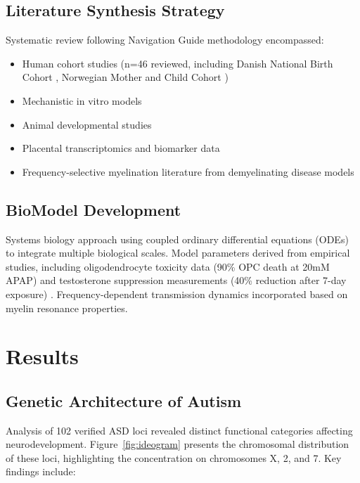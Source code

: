 \documentclass[12pt]{article}
\begin{document}
\subsection{Literature Synthesis Strategy}
Systematic review following Navigation Guide methodology \citep{navarro2025} encompassed:
\begin{itemize}
\item Human cohort studies (n=46 reviewed, including Danish National Birth Cohort \citep{liew2016}, Norwegian Mother and Child Cohort \citep{brandlistuen2013,ystrom2017})
\item Mechanistic in vitro models \citep{perez2012,posadas2019}
\item Animal developmental studies \citep{viberg2014,philippot2022,blecharz2018}
\item Placental transcriptomics and biomarker data \citep{ji2020}
\item Frequency-selective myelination literature from demyelinating disease models
\end{itemize}

\subsection{BioModel Development}
Systems biology approach using coupled ordinary differential equations (ODEs) to integrate multiple biological scales. Model parameters derived from empirical studies, including oligodendrocyte toxicity data (90\% OPC death at 20mM APAP) \citep{perez2012} and testosterone suppression measurements (40\% reduction after 7-day exposure) \citep{kristensen2016}. Frequency-dependent transmission dynamics incorporated based on myelin resonance properties.

\section{Results}

\subsection{Genetic Architecture of Autism}
Analysis of 102 verified ASD loci revealed distinct functional categories affecting neurodevelopment. Figure~\ref{fig:ideogram} presents the chromosomal distribution of these loci, highlighting the concentration on chromosomes X, 2, and 7. Key findings include:
\end{document}
